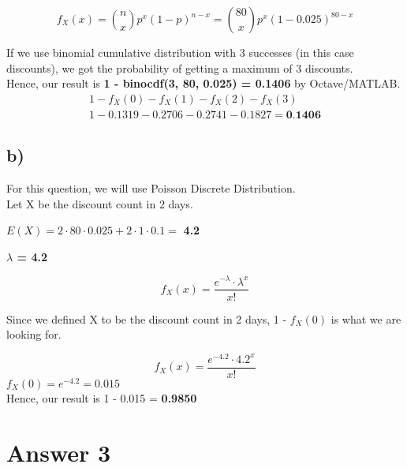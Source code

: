 \documentclass[12pt]{article}
\begin{document}
\begin{equation*}
    f_X(x) = \binom{n}{x} p^x (1-p)^{n-x}
    = \binom{80}{x} p^x (1-0.025)^{80-x} 
\end{equation*}

If we use binomial cumulative distribution with 3 successes (in this case discounts), we got the probability of getting a maximum of 3 discounts. \\

Hence, our result is \textbf{1 - binocdf(3, 80, 0.025) = 0.1406} by Octave/MATLAB. \\

\begin{align*}
    1 - f_X(0) - f_X(1) - f_X(2) - f_X(3) \\
    1 - 0.1319 - 0.2706 - 0.2741 - 0.1827 = \textbf{0.1406}
\end{align*}

\subsection*{b)} 
For this question, we will use Poisson Discrete Distribution. \\

Let X be the discount count in 2 days.

$E(X) = 2 \cdot 80 \cdot 0.025 + 2 \cdot 1 \cdot 0.1 =$ \textbf{4.2}

\textbf{$\lambda$ = 4.2}

\begin{equation*}
    f_X(x) = \frac{e^{-\lambda}\cdot\lambda^x}{x!}
\end{equation*}

Since we defined X to be the discount count in 2 days, 1 - $f_X(0)$ is what we are looking for.

\begin{equation*}
    f_X(x) = \frac{e^{-4.2}\cdot4.2^x}{x!}
\end{equation*}
$f_X(0) = e^{-4.2} = 0.015$ \\

Hence, our result is 1 - 0.015 = \textbf{0.9850}

\section*{Answer 3}

\lstset{language=matlab}
\end{document}
